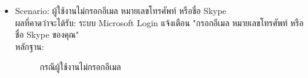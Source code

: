 \documentclass[14pt,oneside,openright,a4paper]{cpe-thai-project}
\begin{document}
\begin{itemize}
  \item Scenario: ผู้ใช้งานไม่กรอกอีเมล หมายเลขโทรศัพท์ หรือชื่อ Skype
  \\ผลที่คาดว่าจะได้รับ: ระบบ Microsoft Login แจ้งเตือน "กรอกอีเมล หมายเลขโทรศัพท์ หรือชื่อ Skype ของคุณ"
  \\หลักฐาน:\\
  \begin{figure}[!h]\centering
    \setlength{\fboxrule}{0.5mm} %
    \setlength{\fboxsep}{0.5cm}
    \caption{กรณีผู้ใช้งานไม่กรอกอีเมล}\label{fig:LoginPageTest}
  \end{figure}
\end{itemize}

\newpage
\end{document}
